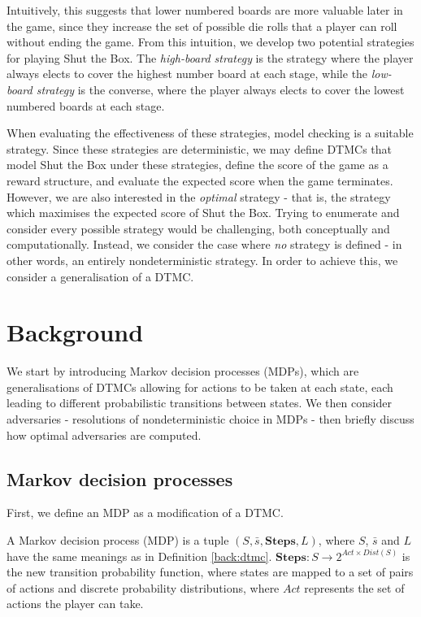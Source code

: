 Intuitively, this suggests that lower numbered boards are more valuable later in the game, since they increase the set of possible die rolls that a player can roll without ending the game. From this intuition, we develop two potential strategies for playing Shut the Box. The \emph{high-board strategy} is the strategy where the player always elects to cover the highest number board at each stage, while the \emph{low-board strategy} is the converse, where the player always elects to cover the lowest numbered boards at each stage.

When evaluating the effectiveness of these strategies, model checking is a suitable strategy. Since these strategies are deterministic, we may define DTMCs that model Shut the Box under these strategies, define the score of the game as a reward structure, and evaluate the expected score when the game terminates. However, we are also interested in the \emph{optimal} strategy - that is, the strategy which maximises the expected score of Shut the Box. Trying to enumerate and consider every possible strategy would be challenging, both conceptually and computationally. Instead, we consider the case where \emph{no} strategy is defined - in other words, an entirely nondeterministic strategy. In order to achieve this, we consider a generalisation of a DTMC.

\section{Background}
\label{cs1:stb_background}

We start by introducing Markov decision processes (MDPs), which are generalisations of DTMCs allowing for actions to be taken at each state, each leading to different probabilistic transitions between states. We then consider adversaries - resolutions of nondeterministic choice in MDPs - then briefly discuss how optimal adversaries are computed.

\subsection{Markov decision processes}
\label{cs1:mdps}
First, we define an MDP as a modification of a DTMC.

\begin{definition}
\label{cs1:def_mdps}

A Markov decision process (MDP) is a tuple $(S, \bar{s}, \mathbf{Steps}, L)$, where $S$, $\bar{s}$ and $L$ have the same meanings as in Definition \ref{back:dtmc}. $\mathbf{Steps} : S \rightarrow 2^{Act \times Dist(S)}$ is the new transition probability function, where states are mapped to a set of pairs of actions and discrete probability distributions, where $Act$ represents the set of actions the player can take.

\end{definition}

